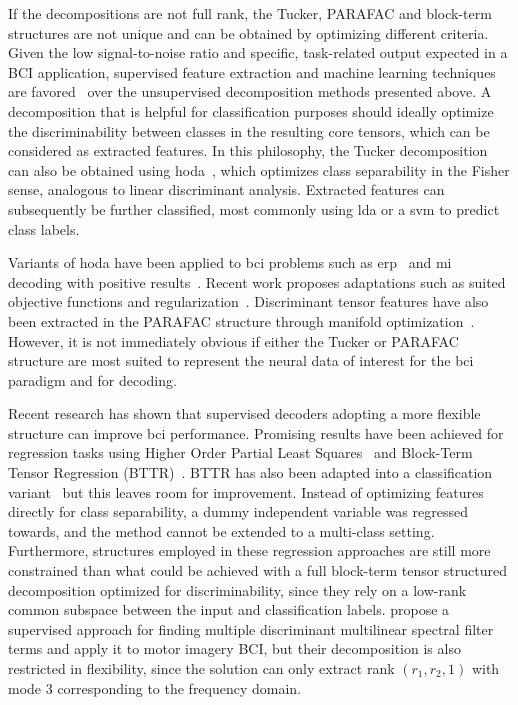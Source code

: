 If the decompositions are not full rank, the Tucker, PARAFAC and block-term
structures are not unique and can be obtained by optimizing different criteria.
Given the low signal-to-noise ratio and specific, task-related output expected
in a BCI application, supervised feature extraction and machine learning techniques are
favored~\cite{Lotte2018} over the unsupervised decomposition methods presented
above.
A decomposition that is helpful for classification purposes should ideally optimize
the discriminability between classes in the resulting core tensors, which can
be considered as extracted features.
In this philosophy, the Tucker decomposition can also be obtained
using \ac{hoda}~\cite{Yan2005,Phan2010,Froelich2018}, which optimizes class separability in the Fisher sense, analogous to linear
discriminant analysis.
Extracted features can subsequently be further classified, most commonly
using \ac{lda} or a \ac{svm} to predict class labels.

Variants of \ac{hoda} have been applied to \ac{bci} problems such as
\ac{erp}~\cite{Onishi2012,Higashi2016} and \ac{mi}~\cite{Liu2015,Cai2021}
decoding with positive results~\cite{Lotte2018}.
Recent work proposes adaptations such as suited objective
functions and regularization~\cite{JamshidiIdaji2017,Jorajuria2022,Aghili2023}.
Discriminant tensor features have also been extracted
in the PARAFAC structure through manifold optimization~\cite{Froelich2018}.
However, it is not immediately obvious if either the Tucker or PARAFAC
structure are most suited to represent the neural data of interest for the
\ac{bci}
paradigm and for decoding.

Recent research has shown that supervised decoders adopting a more flexible structure
can improve \ac{bci} performance.
Promising results have been achieved for regression tasks using
Higher Order Partial Least Squares~\cite{Camarrone2018} and Block-Term Tensor
Regression (BTTR)~\cite{Faes2022,Faes2022a}.
BTTR has also been adapted into a classification variant~\cite{Camarrone2021}
but this leaves room for improvement.
Instead of optimizing features directly for class separability, a dummy
independent variable was regressed towards, and the method
cannot be extended to a multi-class setting.
Furthermore, structures employed in these regression approaches are still more constrained
than what could be achieved with a full block-term tensor structured decomposition
optimized for discriminability, since they rely on a low-rank common subspace
between the input and classification labels.
\textcite{Huang2020} propose a supervised approach for finding multiple discriminant
multilinear spectral filter terms and apply it to motor imagery BCI, but their
decomposition is also restricted in flexibility, since the solution can only
extract rank $(r_1,r_2,1)$ with mode 3 corresponding to the frequency domain.

